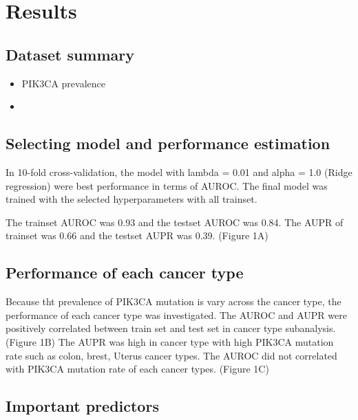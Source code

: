 \documentclass[10pt,letterpaper]{article}
\begin{document}
\hypertarget{results}{%
\section{Results}\label{results}}

\hypertarget{dataset-summary}{%
\subsection{Dataset summary}\label{dataset-summary}}

\begin{itemize}
\item
  PIK3CA prevalence
\item
\end{itemize}

\hypertarget{selecting-model-and-performance-estimation}{%
\subsection{Selecting model and performance
estimation}\label{selecting-model-and-performance-estimation}}

In 10-fold cross-validation, the model with lambda = 0.01 and alpha =
1.0 (Ridge regression) were best performance in terms of AUROC. The
final model was trained with the selected hyperparameters with all
trainset.

The trainset AUROC was 0.93 and the testset AUROC was 0.84. The AUPR of
trainset was 0.66 and the testset AUPR was 0.39. (Figure 1A)

\hypertarget{performance-of-each-cancer-type}{%
\subsection{Performance of each cancer
type}\label{performance-of-each-cancer-type}}

Because tht prevalence of PIK3CA mutation is vary across the cancer
type, the performance of each cancer type was investigated. The AUROC
and AUPR were positively correlated between train set and test set in
cancer type subanalysis. (Figure 1B) The AUPR was high in cancer type
with high PIK3CA mutation rate such as colon, brest, Uterus cancer
types. The AUROC did not correlated with PIK3CA mutation rate of each
cancer types. (Figure 1C)

\hypertarget{important-predictors}{%
\subsection{Important predictors}\label{important-predictors}}
\end{document}
